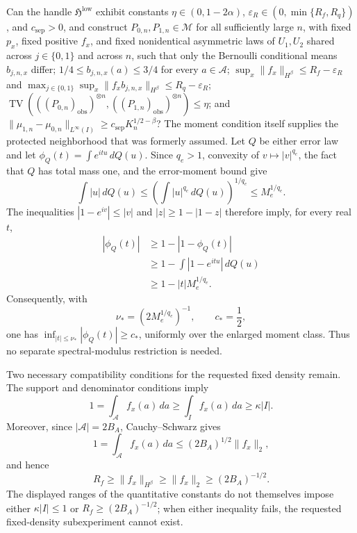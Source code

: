 Can the handle \(\mathfrak H^{\mathrm{low}}\) exhibit constants \(\eta\in(0,1-2\alpha)\), \(\varepsilon_R\in(0,\min\{R_f,R_q\})\), and \(c_{\mathrm{sep}}>0\), and construct \(P_{0,n},P_{1,n}\in\mathcal M\) for all sufficiently large \(n\), with fixed \(p_x\), fixed positive \(f_x\), and fixed nonidentical asymmetric laws of \(U_1,U_2\) shared across \(j\in\{0,1\}\) and across \(n\), such that only the Bernoulli conditional means \(b_{j,n,x}\) differ; \(1/4\le b_{j,n,x}(a)\le3/4\) for every \(a\in\mathcal A\); \(\sup_x\|f_x\|_{H^{\beta}}\le R_f-\varepsilon_R\) and \(\max_{j\in\{0,1\}}\sup_x\|f_xb_{j,n,x}\|_{H^{\beta}}\le R_q-\varepsilon_R\); \(\operatorname{TV}(((P_{0,n})_{\mathrm{obs}})^{\otimes n},((P_{1,n})_{\mathrm{obs}})^{\otimes n})\le\eta\); and \(\|\mu_{1,n}-\mu_{0,n}\|_{L^{\infty}(I)}\ge c_{\mathrm{sep}}K_n^{1/2-\beta}\)?
The moment condition itself supplies the protected neighborhood that was formerly assumed. Let \(Q\) be either error law and let \(\phi_Q(t)=\int e^{itu}\,dQ(u)\). Since \(q_e>1\), convexity of \(v\mapsto |v|^{q_e}\), the fact that \(Q\) has total mass one, and the error-moment bound give
\[
 \int |u|\,dQ(u)
 \le \left(\int |u|^{q_e}\,dQ(u)\right)^{1/q_e}
 \le M_e^{1/q_e}.
\]
The inequalities \(|1-e^{iv}|\le |v|\) and \(|z|\ge 1-|1-z|\) therefore imply, for every real \(t\),
\[
 \begin{aligned}
 |\phi_Q(t)|
 &\ge 1-|1-\phi_Q(t)|\\
 &\ge 1-\int |1-e^{itu}|\,dQ(u)\\
 &\ge 1-|t|M_e^{1/q_e}.
 \end{aligned}
\]
Consequently, with
\[
 \nu_*=(2M_e^{1/q_e})^{-1},
 \qquad c_*=\frac12,
\]
one has \(\inf_{|t|\le\nu_*}|\phi_Q(t)|\ge c_*\), uniformly over the enlarged moment class. Thus no separate spectral-modulus restriction is needed.

Two necessary compatibility conditions for the requested fixed density remain. The support and denominator conditions imply
\[
 1=\int_{\mathcal A}f_x(a)\,da
 \ge \int_I f_x(a)\,da
 \ge \kappa |I|.
\]
Moreover, since \(|\mathcal A|=2B_A\), Cauchy--Schwarz gives
\[
 1=\int_{\mathcal A}f_x(a)\,da
 \le (2B_A)^{1/2}\|f_x\|_2,
\]
and hence
\[
 R_f\ge \|f_x\|_{H^\beta}\ge \|f_x\|_2
 \ge (2B_A)^{-1/2}.
\]
The displayed ranges of the quantitative constants do not themselves impose either \(\kappa|I|\le1\) or \(R_f\ge(2B_A)^{-1/2}\); when either inequality fails, the requested fixed-density subexperiment cannot exist.

